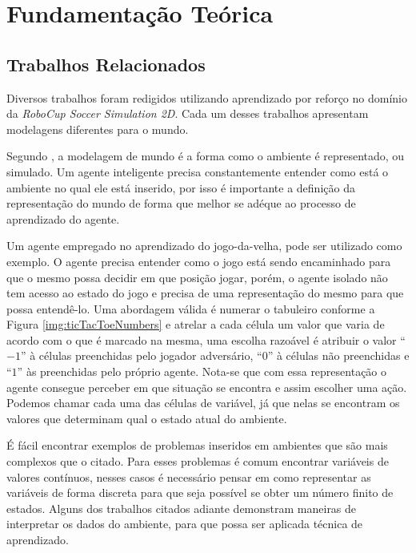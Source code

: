 \chapter{Fundamentação Teórica}\label{sec:fundamentation}

\section{Trabalhos Relacionados}\label{trabalhosRelacionados}

Diversos trabalhos foram redigidos utilizando aprendizado por reforço no domínio da \textit{RoboCup
Soccer Simulation 2D}. Cada um desses trabalhos apresentam modelagens diferentes para o mundo.

Segundo , a modelagem de mundo é a forma como o ambiente é representado, ou simulado. Um agente inteligente
precisa constantemente entender como está o ambiente no qual ele está inserido, por isso é
importante a definição da representação do mundo de forma que melhor se adéque ao processo de
aprendizado do agente.

Um agente empregado no aprendizado do jogo-da-velha, pode ser utilizado como exemplo. O agente
precisa entender como o jogo está sendo encaminhado para que o mesmo possa decidir em que posição
jogar, porém, o agente isolado não tem acesso ao estado do jogo e precisa de uma representação do
mesmo para que possa entendê-lo. Uma abordagem válida é numerar o tabuleiro conforme a Figura
\ref{img:ticTacToeNumbers} e atrelar a cada célula um valor que varia de acordo com o que é marcado
na mesma, uma escolha razoável é atribuir o valor ``$-1$'' à células preenchidas pelo jogador
adversário, ``$0$'' à células não preenchidas e ``$1$'' às preenchidas pelo próprio agente. Nota-se que com
essa representação o agente consegue perceber em que situação se encontra e assim escolher uma ação.
Podemos chamar cada uma das células de variável, já que nelas se encontram os valores que determinam
qual o estado atual do ambiente.


É fácil encontrar exemplos de problemas inseridos em ambientes que são mais complexos que o citado.
Para esses problemas é comum encontrar variáveis de valores contínuos, nesses casos é necessário
pensar em como representar as variáveis de forma discreta para que seja possível se obter um número
finito de estados. Alguns dos trabalhos citados adiante demonstram maneiras de interpretar os dados
do ambiente, para que possa ser aplicada técnica de aprendizado. 

